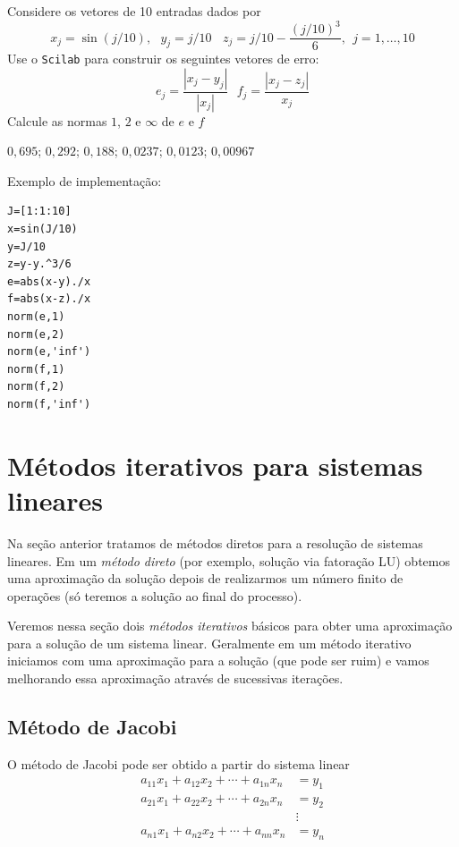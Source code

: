 \begin{Exercise} Considere os vetores de 10 entradas dados por $$x_j=\sin(j/10),~~~y_j=j/10~~~~z_j=j/10-\frac{\left(j/10\right)^3}{6},~~ j=1,\ldots,10$$
Use o \verb+Scilab+ para construir os seguintes vetores de erro:
$$e_{j}=\frac{|x_j-y_j|}{|x_j|}~~~ f_j=\frac{|x_j-z_j|}{x_j}$$
Calcule as normas $1$, $2$ e $\infty$ de $e$ e $f$
\end{Exercise}
\begin{Answer}
  \begin{tiny}
$0,695$; $0,292$; $0,188$;  $0,0237$; $0,0123$; $0,00967$

\ifisscilab
Exemplo de implementação:
\begin{verbatim}
J=[1:1:10]
x=sin(J/10)
y=J/10
z=y-y.^3/6
e=abs(x-y)./x
f=abs(x-z)./x
norm(e,1)
norm(e,2)
norm(e,'inf')
norm(f,1)
norm(f,2)
norm(f,'inf')
\end{verbatim}
\fi    
  \end{tiny}
\end{Answer}



\section{Métodos iterativos para sistemas lineares}
Na seção anterior tratamos de métodos diretos para a resolução de sistemas lineares. Em um \emph{método direto} (por exemplo, solução via fatoração LU) obtemos uma aproximação da solução depois de realizarmos um número finito de operações (só teremos a solução ao final do processo).

Veremos nessa seção dois \emph{métodos iterativos} básicos para obter uma aproximação para a solução de um sistema linear. Geralmente em um método iterativo iniciamos com uma aproximação para a solução (que pode ser ruim) e vamos melhorando essa aproximação através de sucessivas iterações.




\subsection{Método de Jacobi}
O método de Jacobi pode ser obtido a partir do sistema linear
\begin{align}
a_{11}x_1+a_{12}x_2+\cdots+a_{1n}x_n&=y_1\\
a_{21}x_1+a_{22}x_2+\cdots+a_{2n}x_n&=y_2\\
&\vdots     \\
a_{n1}x_1+a_{n2}x_2+\cdots+a_{nn}x_n&=y_n
\end{align}

